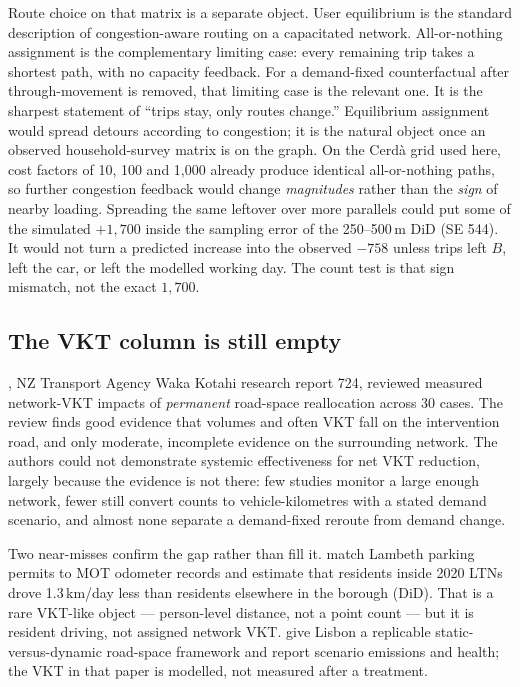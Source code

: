 \documentclass[a4paper,fleqn]{cas-dc}
\begin{document}
Route choice on that matrix is a separate object. User equilibrium
\citep{Wardrop1952} is the standard description of congestion-aware routing
on a capacitated network. All-or-nothing assignment is the complementary
limiting case: every remaining trip takes a shortest path, with no capacity
feedback. For a demand-fixed counterfactual after through-movement is
removed, that limiting case is the relevant one. It is the sharpest statement
of ``trips stay, only routes change.'' Equilibrium assignment would spread
detours according to congestion; it is the natural object once an observed
household-survey matrix is on the graph. On the Cerd\`a grid used here, cost
factors of 10, 100 and 1{,}000 already produce identical all-or-nothing paths,
so further congestion feedback would change \emph{magnitudes} rather than the
\emph{sign} of nearby loading. Spreading the same leftover over more
parallels could put some of the simulated $+1{,}700$ inside the sampling
error of the 250--500\,m DiD (SE 544). It would not turn a predicted increase
into the observed $-758$ unless trips left $B$, left the car, or left the
modelled working day. The count test is that sign mismatch, not the exact
$1{,}700$.

\subsection{The VKT column is still empty}

\citet{Koorey2025}, NZ Transport Agency Waka Kotahi research report 724,
reviewed measured network-VKT impacts of \emph{permanent} road-space
reallocation across 30 cases. The review finds good evidence that volumes and
often VKT fall on the intervention road, and only moderate, incomplete
evidence on the surrounding network. The authors could not demonstrate
systemic effectiveness for net VKT reduction, largely because the evidence is
not there: few studies monitor a large enough network, fewer still convert
counts to vehicle-kilometres with a stated demand scenario, and almost none
separate a demand-fixed reroute from demand change.

Two near-misses confirm the gap rather than fill it. \citet{Goodman2023} match
Lambeth parking permits to MOT odometer records and estimate that residents
inside 2020 LTNs drove 1.3\,km/day less than residents elsewhere in the
borough (DiD). That is a rare VKT-like object --- person-level distance, not a
point count --- but it is resident driving, not assigned network VKT.
\citet{Matajs2026} give Lisbon a replicable static-versus-dynamic road-space
framework and report scenario emissions and health; the VKT in that paper is
modelled, not measured after a treatment.
\end{document}
